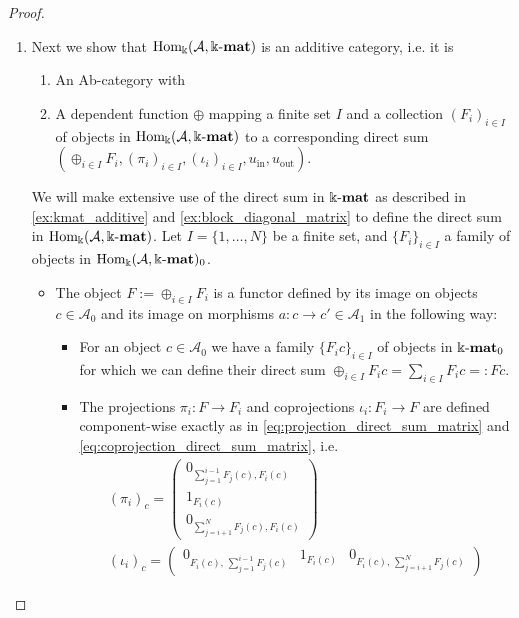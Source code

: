 \begin{proof}
\begin{enumerate}
\item Next we show that $\mathrm{Hom_{\Bbbk}}(\mathcal{A},\Bbbk\textnormal{-}\mathbf{mat})$ is an additive category, i.e. it is
\begin{enumerate}
\renewcommand{\labelenumii}{(\roman{enumii})}
\item An Ab-category with
\item A dependent function $\oplus$ mapping a finite set $I$ and a collection $(F_{i})_{i\in I}$ of objects in $\mathrm{Hom_{\Bbbk}}(\mathcal{A},\Bbbk\textnormal{-}\mathbf{mat})$
to a corresponding direct sum $( \oplus_{i\in I} F_{i}, (\pi_{i})_{i\in I}, (\iota_{i})_{i\in I}, u_{\mathrm{in}}, u_{\mathrm{out}} )$.
\end{enumerate}
\begin{subproof}[Proof of (ii)]
We will make extensive use of the direct sum in $\Bbbk\textnormal{-}\mathbf{mat}$ as described in \ref{ex:kmat_additive} and \ref{ex:block_diagonal_matrix} to
define the direct sum in $\mathrm{Hom_{\Bbbk}}(\mathcal{A},\Bbbk\textnormal{-}\mathbf{mat})$.
Let $I = \{1,\dots,N\}$ be a finite set, and $\{F_{i} \}_{i \in I}$ a family of objects in $\mathrm{Hom_{\Bbbk}}(\mathcal{A},\Bbbk\textnormal{-}\mathbf{mat})_{0}$.
\begin{itemize}
\item The object $F := \oplus_{i \in I} F_{i}$ is a functor defined by its image on objects $c \in \mathcal{A}_{0}$ and its
image on morphisms $a : c \rightarrow c' \in \mathcal{A}_{1}$ in the following way:
\begin{itemize}
\item For an object $c \in \mathcal{A}_{0}$ we have a family $\{F_{i} c \}_{i \in I}$ of objects in $\Bbbk\textnormal{-}\mathbf{mat}_{0}$ for which we can define
their direct sum $\oplus_{i \in I} F_{i} c = \sum_{i \in I} F_{i} c =: F c$.
\item The projections $\pi_{i} : F \rightarrow F_{i}$ and coprojections $\iota_{i} : F_{i} \rightarrow F$ are defined component-wise
exactly as in \eqref{eq:projection_direct_sum_matrix} and \eqref{eq:coprojection_direct_sum_matrix}, i.e.
\begin{align}
(\pi_{i})_{c} =
\begin{pmatrix}
0_{\sum_{j=1}^{i-1} F_{j}(c), F_{i}(c)} \\
1_{F_{i}(c)} \\
0_{\sum_{j=i+1}^{N} F_{j}(c), F_{i}(c)}
\end{pmatrix} \\
(\iota_{i})_{c} = 
\begin{pmatrix}
0_{F_{i}(c),\,\sum\limits_{j=1}^{i-1} F_{j}(c)} & 1_{F_{i}(c)} & 0_{F_{i}(c),\,\sum\limits_{j=i+1}^{N} F_{j}(c)}
\end{pmatrix}
\end{align}


\end{itemize}
\end{itemize}
\end{subproof}
\end{enumerate}
\end{proof}
